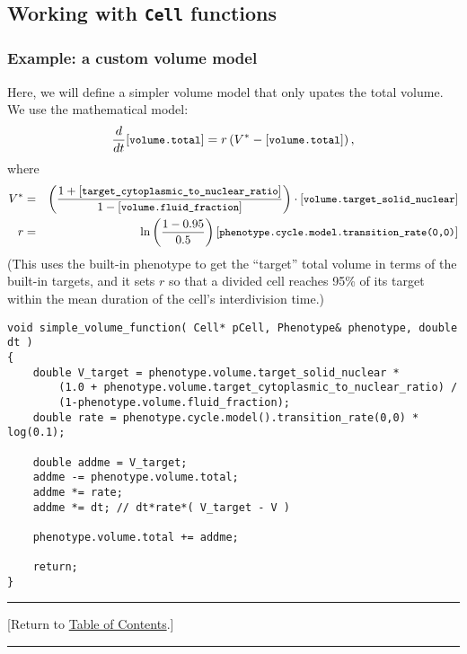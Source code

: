 \documentclass[12pt]{article}
\newcommand{\beq}{\begin{equation}}
\newcommand{\eeq}{\end{equation}}
\newcommand{\beqa}{\begin{eqnarray}}
\newcommand{\eeqa}{\end{eqnarray}}
\renewcommand{\tt}[1]{{\small \left[\texttt{#1}\right] }}
\newcommand{\TOClink}{\begin{center}\hrule\vskip-10pt\phantom{.}\hfill[Return to \hyperlink{TOC}{Table of Contents}.]\hfill\phantom{.}\vskip3pt\hrule\end{center}}
\begin{document}
\subsection{Working with \texttt{Cell} functions}

\subsubsection{Example: a custom volume model}
\label{sec:Examples:volume_model}
Here, we will define a simpler volume model that only 
upates the total volume. We 
use the mathematical model: 
\beq
\frac{d}{dt} 
\tt{volume.total} = r \left( V^* - \tt{volume.total} \right),  
\eeq
where 
\beqa
V^* & = & \left( \frac{1 + \tt{target\_cytoplasmic\_to\_nuclear\_ratio}}
{1 - \tt{volume.fluid\_fraction}} \right) \cdot 
\tt{volume.target\_solid\_nuclear} \\
r & = & 
\ln\left( 
\frac{1 - 0.95}{0.5}
\right) \tt{phenotype.cycle.model.transition\_rate(0,0)} 
\eeqa
(This uses the built-in phenotype to get the ``target'' total volume in 
terms of the built-in  targets, and it sets $r$ so that a divided cell reaches 
95\% of its target within the mean duration of the cell's interdivision 
time.) 
\begin{verbatim}
void simple_volume_function( Cell* pCell, Phenotype& phenotype, double dt )
{
    double V_target = phenotype.volume.target_solid_nuclear * 
        (1.0 + phenotype.volume.target_cytoplasmic_to_nuclear_ratio) / 
        (1-phenotype.volume.fluid_fraction); 
    double rate = phenotype.cycle.model().transition_rate(0,0) * log(0.1); 
    
    double addme = V_target; 
    addme -= phenotype.volume.total; 
    addme *= rate; 
    addme *= dt; // dt*rate*( V_target - V )
    
    phenotype.volume.total += addme; 
    
    return; 
}
\end{verbatim}

\TOClink 
\end{document}
